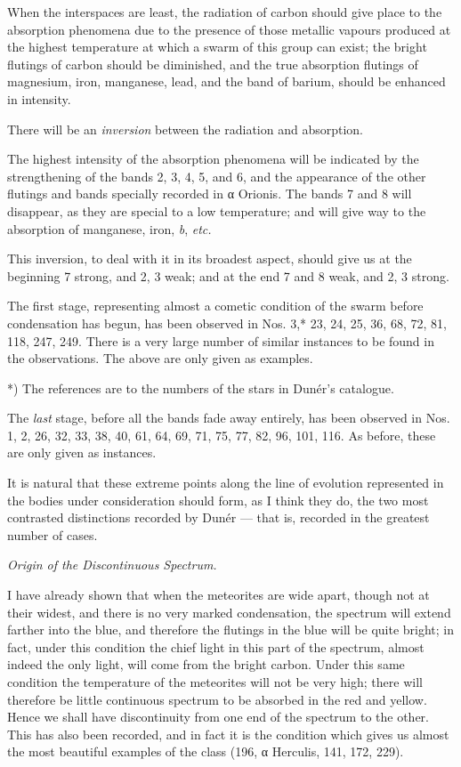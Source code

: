 \documentclass[a4paper, 12pt, oneside, polutonikogreek, english]{article}
\begin{document}
When the interspaces are least, the radiation of carbon should give place to the absorption phenomena due to the presence of those metallic vapours produced at the highest temperature at which a swarm of this group can exist; the bright flutings of carbon should be diminished, and the true absorption flutings of magnesium, iron, manganese, lead, and the band of barium, should be enhanced in intensity.

There will be an \emph{inversion} between the radiation and absorption.

The highest intensity of the absorption phenomena will be indicated by the strengthening of the bands 2, 3, 4, 5, and 6, and the appearance of the other flutings and bands specially recorded in α Orionis. The bands 7 and 8 will disappear, as they are special to a low temperature; and will give way to the absorption of manganese, iron, \emph{b}, \emph{etc.}

This inversion, to deal with it in its broadest aspect, should give us at the beginning 7 strong, and 2, 3 weak; and at the end 7 and 8 weak, and 2, 3 strong.

The first stage, representing almost a cometic condition of the swarm before condensation has begun, has been observed in Nos. 3,* 23, 24, 25, 36, 68, 72, 81, 118, 247, 249. There is a very large number of similar instances to be found in the observations. The above are only given as examples.

*) The references are to the numbers of the stars in Dunér's catalogue.

The \emph{last} stage, before all the bands fade away entirely, has been observed in Nos. 1, 2, 26, 32, 33, 38, 40, 61, 64, 69, 71, 75, 77, 82, 96, 101, 116. As before, these are only given as instances.

It is natural that these extreme points along the line of evolution represented in the bodies under consideration should form, as I think they do, the two most contrasted distinctions recorded by Dunér --- that is, recorded in the greatest number of cases.

\emph{Origin of the Discontinuous Spectrum.}

I have already shown that when the meteorites are wide apart, though not at their widest, and there is no very marked condensation, the spectrum will extend farther into the blue, and therefore the flutings in the blue will be quite bright; in fact, under this condition the chief light in this part of the spectrum, almost indeed the only light, will come from the bright carbon. Under this same condition the temperature of the meteorites will not be very high; there will therefore be little continuous spectrum to be absorbed in the red and yellow. Hence we shall have discontinuity from one end of the spectrum to the other. This has also been recorded, and in fact it is the condition which gives us almost the most beautiful examples of the class (196, α Herculis, 141, 172, 229).
\end{document}
